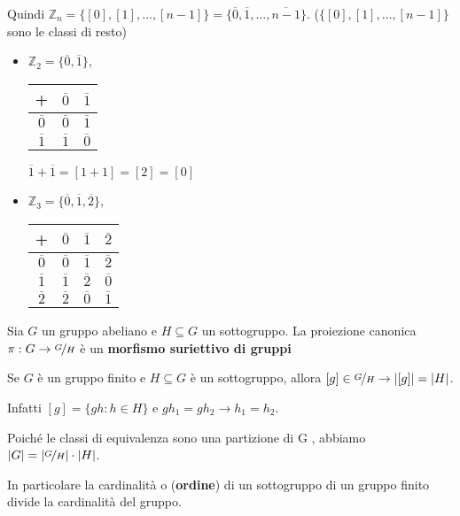\documentclass[../main.tex]{subfiles}
\begin{document}
\begin{example}
\begin{itemize}
              Quindi $\mathbb{Z}_n = \{[0],[1],\ldots,[n-1]\} = \{\overline{0}, \overline{1},\ldots,\overline{n - 1}\}$. ($\{[0],[1],\ldots,[n-1]\}$ sono le classi di resto)
              \begin{itemize}
                  \item $\mathbb{Z}_2 = \{\overline{0},\overline{1}\}$,
                        \begin{tabular}{c|c|c}
                            +              & $\overline{0}$ & $\overline{1}$ \\ \hline
                            $\overline{0}$ & $\overline{0}$ & $\overline{1}$ \\ \hline
                            $\overline{1}$ & $\overline{1}$ & $\overline{0}$ \\
                        \end{tabular}
                        $\overline{1} + \overline{1} = [1 + 1] = [2] = [0]$
                  \item $\mathbb{Z}_3 = \{\overline{0},\overline{1},\overline{2}\}$,
                        \begin{tabular}{c|c|c|c}
                            +              & $\overline{0}$ & $\overline{1}$ & $\overline{2}$ \\ \hline
                            $\overline{0}$ & $\overline{0}$ & $\overline{1}$ & $\overline{2}$ \\ \hline
                            $\overline{1}$ & $\overline{1}$ & $\overline{2}$ & $\overline{0}$ \\ \hline
                            $\overline{2}$ & $\overline{2}$ & $\overline{0}$ & $\overline{1}$ \\
                        \end{tabular}
              \end{itemize}
    \end{itemize}
\end{example}

\begin{definition}
    Sia $G$ un gruppo abeliano e $H \subseteq G$ un sottogruppo. La proiezione canonica $\pi : G \rightarrow \nicefrac{G}{H}$ è un \textbf{morfismo suriettivo di gruppi}
\end{definition}

Se $G$ è un gruppo finito e $H \subseteq G$ è un sottogruppo, allora $[g] \in \nicefrac{G}{H} \rightarrow |[g]| = |H|$.

Infatti $[g] = \{gh : h \in  H\}$ e $gh_1 = gh_2 \rightarrow h_1 = h_2$.

Poiché le classi di equivalenza sono una partizione di G , abbiamo $|G| = |\nicefrac{G}{H}| \cdot |H|$.

In particolare la cardinalità o (\textbf{ordine}) di un sottogruppo di un gruppo finito divide la cardinalità del gruppo.
\end{document}
